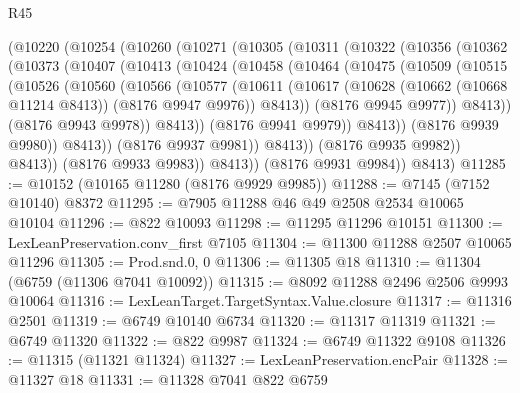 \begin{lexlean}{R45}
\begin{coremodule}
{      (@10220
        (@10254
          (@10260
            (@10271
              (@10305
                (@10311
                  (@10322
                    (@10356
                      (@10362
                        (@10373
                          (@10407
                            (@10413
                              (@10424
                                (@10458
                                  (@10464
                                    (@10475
                                      (@10509
                                        (@10515
                                          (@10526
                                            (@10560
                                              (@10566
                                                (@10577
                                                  (@10611
                                                    (@10617
                                                      (@10628
                                                        (@10662 (@10668 @11214 @8413))
                                                        (@8176 @9947 @9976))
                                                      @8413))
                                                  (@8176 @9945 @9977))
                                                @8413))
                                            (@8176 @9943 @9978))
                                          @8413))
                                      (@8176 @9941 @9979))
                                    @8413))
                                (@8176 @9939 @9980))
                              @8413))
                          (@8176 @9937 @9981))
                        @8413))
                    (@8176 @9935 @9982))
                  @8413))
              (@8176 @9933 @9983))
            @8413))
        (@8176 @9931 @9984))
      @8413)
@11285 := @10152 (@10165 @11280 (@8176 @9929 @9985))
@11288 := @7145 (@7152 @10140) @8372
@11295 := @7905 @11288 @46 @49 @2508 @2534 @10065 @10104
@11296 := @822 @10093
@11298 := @11295 @11296 @10151
@11300 := LexLeanPreservation.conv_first @7105
@11304 := @11300 @11288 @2507 @10065 @11296
@11305 := Prod.snd.{0, 0}
@11306 := @11305 @18
@11310 := @11304 (@6759 (@11306 @7041 @10092))
@11315 := @8092 @11288 @2496 @2506 @9993 @10064
@11316 := LexLeanTarget.TargetSyntax.Value.closure
@11317 := @11316 @2501
@11319 := @6749 @10140 @6734
@11320 := @11317 @11319
@11321 := @6749 @11320
@11322 := @822 @9987
@11324 := @6749 @11322 @9108
@11326 := @11315 (@11321 @11324)
@11327 := LexLeanPreservation.encPair
@11328 := @11327 @18
@11331 := @11328 @7041 @822 @6759
}
\end{coremodule}
\end{lexlean}
